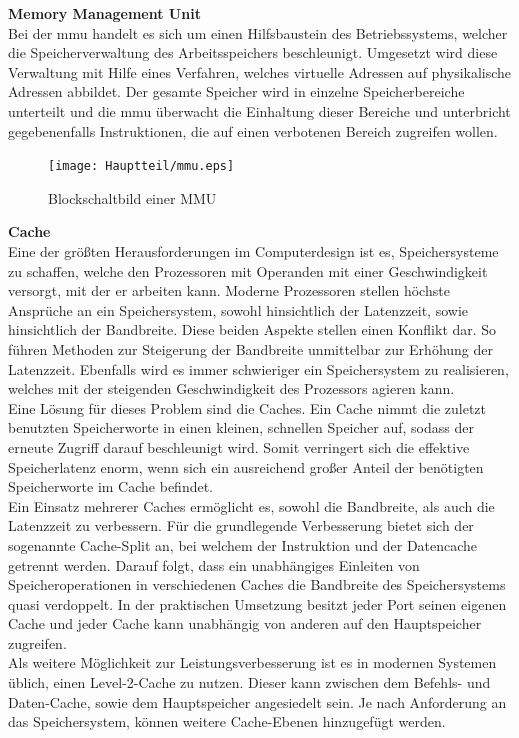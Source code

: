\newpage

\textbf{Memory Management Unit}\\
Bei der \ac{mmu} handelt es sich um einen Hilfsbaustein des Betriebssystems, welcher die Speicherverwaltung des Arbeitsspeichers beschleunigt. Umgesetzt wird diese Verwaltung mit
Hilfe eines Verfahren, welches virtuelle Adressen auf physikalische Adressen abbildet. Der gesamte Speicher wird in einzelne Speicherbereiche unterteilt und die
\ac{mmu} überwacht die Einhaltung dieser Bereiche und unterbricht gegebenenfalls Instruktionen, die auf einen verbotenen
Bereich zugreifen wollen.\cite{itwissen}\\

\begin{figure}[H]
\centering
\texttt{[image: Hauptteil/mmu.eps]}
\caption{Blockschaltbild einer MMU}\label{fig:mmu}
\end{figure}


\textbf{Cache}\\
Eine der größten Herausforderungen im Computerdesign ist es, Speichersysteme zu schaffen, welche den Prozessoren mit Operanden mit einer Geschwindigkeit versorgt, mit der er arbeiten kann.
Moderne Prozessoren stellen höchste Ansprüche an ein Speichersystem, sowohl hinsichtlich der Latenzzeit, sowie hinsichtlich der Bandbreite. Diese beiden Aspekte stellen einen Konflikt dar. So führen
Methoden zur Steigerung der Bandbreite unmittelbar zur Erhöhung der Latenzzeit.
Ebenfalls wird es immer schwieriger ein Speichersystem zu realisieren, welches mit der steigenden Geschwindigkeit des Prozessors agieren kann.\\
Eine Lösung für dieses Problem sind die Caches. Ein Cache nimmt die zuletzt benutzten Speicherworte in einen kleinen, schnellen Speicher auf, sodass der erneute Zugriff darauf beschleunigt wird.
Somit verringert sich die effektive Speicherlatenz enorm, wenn sich ein ausreichend großer Anteil der benötigten Speicherworte im Cache befindet.\\
Ein Einsatz mehrerer Caches ermöglicht es, sowohl die Bandbreite, als auch die Latenzzeit zu verbessern. Für die grundlegende Verbesserung bietet sich der sogenannte Cache-Split an, bei
welchem der Instruktion und der Datencache getrennt werden. Darauf folgt, dass ein unabhängiges Einleiten von Speicheroperationen in verschiedenen Caches die Bandbreite des
Speichersystems quasi verdoppelt. In der praktischen Umsetzung besitzt jeder Port seinen eigenen Cache und jeder Cache kann unabhängig von anderen auf den Hauptspeicher zugreifen.\\
Als weitere Möglichkeit zur Leistungsverbesserung ist es in modernen Systemen üblich, einen Level-2-Cache zu nutzen. Dieser kann zwischen dem Befehls- und Daten-Cache, sowie dem Hauptspeicher
angesiedelt sein. Je nach Anforderung an das Speichersystem, können weitere Cache-Ebenen hinzugefügt werden. \\


